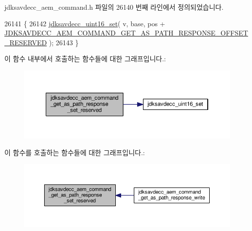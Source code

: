 jdksavdecc\+\_\+aem\+\_\+command.\+h 파일의 26140 번째 라인에서 정의되었습니다.


\begin{DoxyCode}
26141 \{
26142     \hyperlink{group__endian_ga14b9eeadc05f94334096c127c955a60b}{jdksavdecc\_uint16\_set}( v, base, pos + 
      \hyperlink{group__command__get__as__path__response_gada12e4d8eb5af44c58b5d1138b524345}{JDKSAVDECC\_AEM\_COMMAND\_GET\_AS\_PATH\_RESPONSE\_OFFSET\_RESERVED}
       );
26143 \}
\end{DoxyCode}


이 함수 내부에서 호출하는 함수들에 대한 그래프입니다.\+:
\nopagebreak
\begin{figure}[H]
\begin{center}
\leavevmode
\includegraphics[width=350pt]{group__command__get__as__path__response_ga3be39ed1692a046c3f6e262ffa89cf09_cgraph}
\end{center}
\end{figure}




이 함수를 호출하는 함수들에 대한 그래프입니다.\+:
\nopagebreak
\begin{figure}[H]
\begin{center}
\leavevmode
\includegraphics[width=350pt]{group__command__get__as__path__response_ga3be39ed1692a046c3f6e262ffa89cf09_icgraph}
\end{center}
\end{figure}


